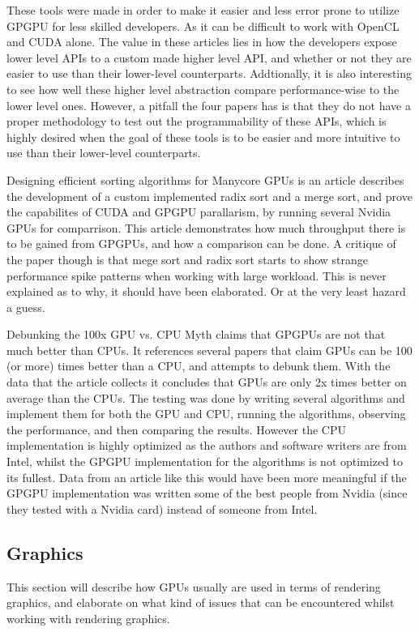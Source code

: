 These tools were made in order to make it easier and less error prone to utilize GP\gls{GPU} for less skilled developers. As it can be difficult to work with OpenCL and CUDA alone.
The value in these articles lies in how the developers expose lower level \glspl{API} to a custom made higher level \gls{API}, and whether or not they are easier to use than their lower-level counterparts. Addtionally, it is also interesting to see how well these higher level abstraction compare performance-wise to the lower level ones. However, a pitfall the four papers has is that they do not have a proper methodology to test out the programmability of these \glspl{API}, which is highly desired when the goal of these tools is to be easier and more intuitive to use than their lower-level counterparts.

Designing efficient sorting algorithms for Manycore \glspl{GPU} \cite{satish_2009_designing} is an article describes the development of a custom implemented radix sort and a merge sort, and prove the capabilites of CUDA and GPGPU parallarism, by running several Nvidia \glspl{GPU} for comparrison. 
This article demonstrates how much throughput there is to be gained from GP\glspl{GPU}, and how a comparison can be done. 
A critique of the paper though is that mege sort and radix sort starts to show strange performance spike patterns when working with large workload. 
This is never explained as to why, it should have been elaborated.
Or at the very least hazard a guess.

Debunking the 100x \gls{GPU} vs. CPU Myth \cite{lee_2010_debunking} claims that GP\glspl{GPU} are not that much better than \glspl{CPU}. 
It references several papers that claim \glspl{GPU} can be 100 (or more) times better than a \gls{CPU}, and attempts to debunk them. 
With the data that the article collects it concludes that \glspl{GPU} are only 2x times better on average than the \glspl{CPU}. 
The testing was done by writing several algorithms and implement them for both the \gls{GPU} and \gls{CPU}, running the algorithms, observing the performance, and then comparing the results. 
However the \gls{CPU} implementation is highly optimized as the authors and software writers are from Intel, whilst the GP\gls{GPU} implementation for the algorithms is not optimized to its fullest. 
Data from an article like this would have been more meaningful if the GP\gls{GPU} implementation was written some of the best people from Nvidia (since they tested with a Nvidia card) instead of someone from Intel.

\subsection{Graphics}
This section will describe how \glspl{GPU} usually are used in terms of rendering graphics, and elaborate on what kind of issues that can be encountered whilst working with rendering graphics.

